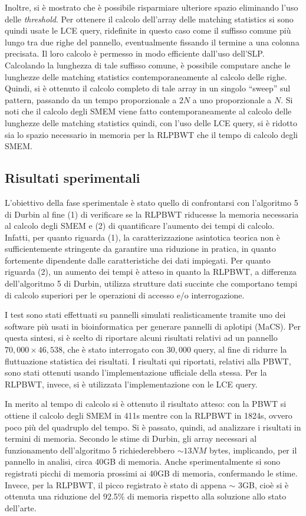\documentclass[a4paper,11pt, oneside,italian]{article}
\begin{document}
Inoltre, si è mostrato che è possibile risparmiare ulteriore spazio eliminando
l'uso delle \textit{threshold}. Per ottenere il calcolo dell'array delle
matching statistics si sono quindi usate le LCE query, ridefinite in questo caso
come il suffisso comune più lungo tra due righe del pannello, eventualmente
fissando il termine a una colonna precisata. Il loro calcolo è permesso
in modo efficiente dall'uso dell'SLP. Calcolando la
lunghezza di tale suffisso comune, è possibile computare anche le
lunghezze delle matching statistics contemporaneamente al calcolo delle
righe. Quindi, si è ottenuto il calcolo completo di tale array in
un singolo ``sweep'' sul pattern, passando da un tempo proporzionale a
$2N$ a uno proporzionale a $N$. Si noti che il calcolo degli SMEM viene fatto
contemporaneamente al calcolo delle lunghezze delle matching statistics quindi,
con l'uso delle LCE query, si è ridotto sia lo spazio necessario in memoria per
la RLPBWT che il tempo di calcolo degli SMEM.

\subsection*{Risultati sperimentali}
L'obiettivo della fase sperimentale è stato quello di confrontarsi con
l'algoritmo 5 di Durbin al fine 
(1) di verificare se la RLPBWT riducesse la memoria necessaria al calcolo degli
SMEM e (2) di quantificare l'aumento dei tempi di calcolo.
Infatti, per quanto riguarda (1), la caratterizzazione asintotica teorica non è
sufficientemente stringente da garantire una riduzione in pratica, in quanto
fortemente dipendente dalle caratteristiche dei dati impiegati.
Per quanto riguarda (2), un aumento dei tempi è atteso in quanto la RLPBWT,
a differenza dell'algoritmo 5 di Durbin, utilizza strutture dati succinte che
comportano tempi di calcolo superiori per le operazioni di accesso e/o
interrogazione. 

I test sono stati effettuati su pannelli simulati realisticamente
tramite uno dei software più usati in bioinformatica per generare pannelli di
aplotipi (MaCS).
Per questa sintesi, si è scelto di riportare alcuni risultati relativi ad un
pannello $70,000 \times 46,538$, che è stato interrogato con $30,000$ query, al
fine di ridurre la fluttuazione statistica dei risultati.
I risultati qui riportati, relativi alla PBWT, sono stati ottenuti usando
l'implementazione ufficiale della stessa. Per la RLPBWT, invece, si è utilizzata
l'implementazione con le LCE query. 

In merito al tempo di calcolo si è ottenuto il risultato atteso: con
la PBWT si ottiene il calcolo degli SMEM in 411s
mentre con la RLPBWT in 1824s, ovvero poco più del quadruplo del tempo.
Si è passato, quindi, ad analizzare i risultati in termini di memoria. Secondo
le stime di Durbin, gli array necessari al funzionamento dell'algoritmo 5
richiederebbero $\sim13NM$ bytes, implicando, per il pannello in analisi, circa
40GB di memoria. 
Anche sperimentalmente si sono registrati
picchi di memoria prossimi ai 40GB di memoria, confermando le stime. Invece,
per la RLPBWT, il picco registrato è stato di appena $\sim$ 3GB,
cioè si è ottenuta una riduzione del 92.5\% di memoria rispetto alla soluzione
allo stato dell'arte. 
\end{document}
